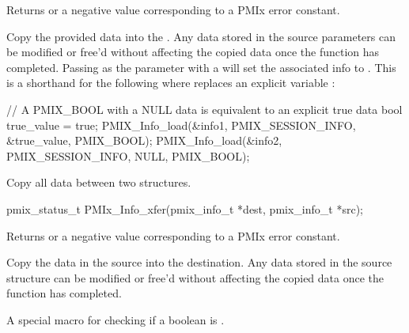 Returns  or a negative value corresponding to a PMIx error constant.

\descr

Copy the provided data into the . Any data stored in the source parameters can be modified or free'd without affecting the copied data once the function has completed. Passing  as the  parameter with a   will set the associated info to . This is a shorthand for the following where  replaces an explicit variable :
\begin{codepar}
  // A PMIX_BOOL with a NULL data is equivalent to an explicit true data
  bool true_value = true;
  PMIX_Info_load(&info1, PMIX_SESSION_INFO, &true_value, PMIX_BOOL);
  PMIX_Info_load(&info2, PMIX_SESSION_INFO, NULL, PMIX_BOOL);
\end{codepar}


\summary

Copy all data between two  structures.

\format

\cspecificstart
\begin{codepar}
pmix_status_t
PMIx_Info_xfer(pmix_info_t *dest,
               pmix_info_t *src);
\end{codepar}
\cspecificend

\begin{arglist}
\end{arglist}

Returns  or a negative value corresponding to a PMIx error constant.

\descr

Copy the data in the source  into the destination. Any data stored in the source structure can be modified or free'd without affecting the copied data once the function has completed.


A special macro for checking if a boolean  is .

